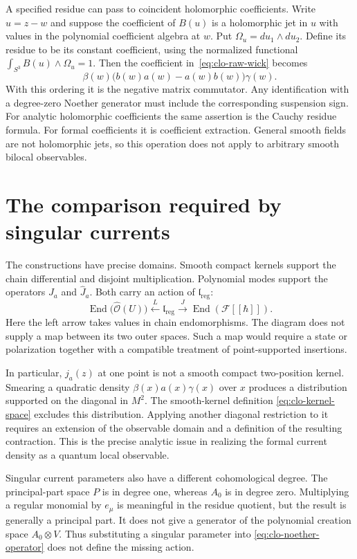 A specified residue can pass to coincident holomorphic coefficients.
Write $u=z-w$ and suppose the coefficient of $B(u)$ is a holomorphic
jet in $u$ with values in the polynomial coefficient algebra at $w$.
Put $\Omega_u=du_1\wedge du_2$.
Define its residue to be its constant coefficient, using the normalized
functional $\int_{S^3}B(u)\wedge\Omega_u=1$.
Then the coefficient in~\eqref{eq:clo-raw-wick} becomes
\[
 \beta(w)\bigl(b(w)a(w)-a(w)b(w)\bigr)\gamma(w).
\]
With this ordering it is the negative matrix commutator.
Any identification with a degree-zero Noether generator must include
the corresponding suspension sign.
For analytic holomorphic coefficients the same assertion is the
Cauchy residue formula. For formal coefficients it is coefficient
extraction. General smooth fields are not holomorphic jets, so this
operation does not apply to arbitrary smooth bilocal observables.

\section{The comparison required by singular currents}
\label{sec:clo-singular-comparison}

The constructions have precise domains.
Smooth compact kernels support the chain differential and disjoint
multiplication. Polynomial modes support the operators $J_a$ and
$\widehat J_a$. Both carry an action of $\mathfrak l_{\mathrm{reg}}$:
\[
 \operatorname{End}\bigl(\widehat{\mathscr O}(U)\bigr)
 \xleftarrow{\ L\ }\mathfrak l_{\mathrm{reg}}
 \xrightarrow{\ J\ }\operatorname{End}(\mathcal F[[\hbar]]).
\]
Here the left arrow takes values in chain endomorphisms.
The diagram does not supply a map between its two outer spaces.
Such a map would require a state or polarization together with a
compatible treatment of point-supported insertions.

In particular, $j_a(z)$ at one point is not a smooth compact
two-position kernel. Smearing a quadratic density
$\beta(x)a(x)\gamma(x)$ over $x$ produces a distribution supported
on the diagonal in $M^2$. The smooth-kernel definition
\eqref{eq:clo-kernel-space} excludes this distribution.
Applying another diagonal restriction to it requires an extension of
the observable domain and a definition of the resulting contraction.
This is the precise analytic issue in realizing the formal current
density as a quantum local observable.

Singular current parameters also have a different cohomological degree.
The principal-part space $P$ is in degree one, whereas $A_0$ is in
degree zero. Multiplying a regular monomial by $e_\mu$ is meaningful
in the residue quotient, but the result is generally a principal part.
It does not give a generator of the polynomial creation space
$A_0\otimes V$. Thus substituting a singular parameter into
\eqref{eq:clo-noether-operator} does not define the missing action.

